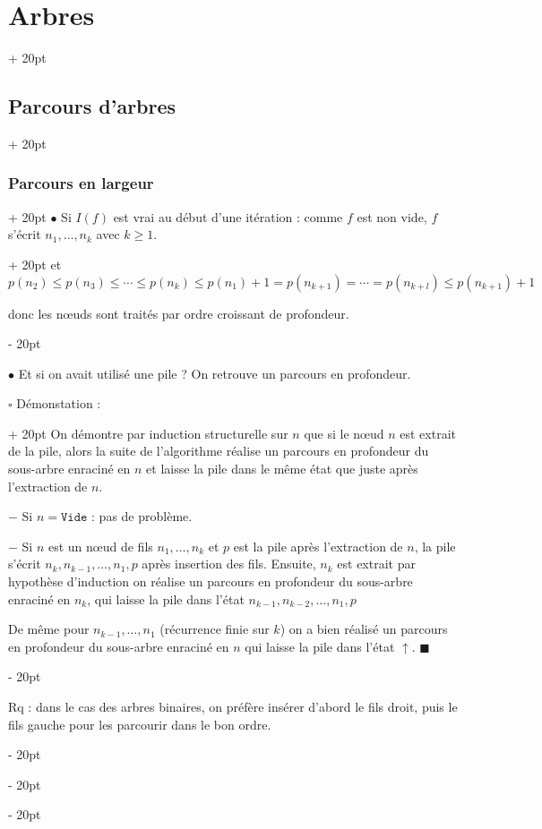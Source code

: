 \documentclass[a4paper, 12pt, twoside]{article}
\renewcommand{\le}{\leqslant}
\renewcommand{\ge}{\geqslant}
\newcommand{\ind}[1][20pt]{\advance\leftskip + #1}
\newcommand{\deind}[1][20pt]{\advance\leftskip - #1}
\newenvironment{indt}[2][20pt]{#2 \par \ind[#1]}{\par \deind} %
\begin{document}
\begin{indt}{\section{Arbres}}
\begin{indt}{\subsection{Parcours d'arbres}}
\begin{indt}{\subsubsection{Parcours en largeur}}
\begin{indt}{$\bullet$ Si $I(f)$ est vrai au début d'une itération : comme $f$ est non vide, $f$ s'écrit $n_1, \ldots, n_k$ avec $k \ge 1$.}
                    et $p(n_2) \le p(n_3) \le \cdots \le p(n_k) \le p(n_1) + 1 = p(n_{k + 1}) = \cdots = p(n_{k + l}) \le p(n_{k + 1}) + 1$
                    
                    donc les n\oe uds sont traités par ordre croissant de profondeur.
                \end{indt}
                
                \vspace{12pt}
                
                $\bullet$ Et si on avait utilisé une pile ?
                On retrouve un parcours en profondeur.
                
                \vspace{12pt}
                
                \begin{indt}{$\square$ Démonstation :}
                    On démontre par induction structurelle sur $n$ que si le n\oe ud $n$ est extrait de la pile, alors la suite de l'algorithme réalise un parcours en profondeur du sous-arbre enraciné en $n$ et laisse la pile dans le même état que juste après l'extraction de $n$.
                    
                    \vspace{6pt}
                    
                    $-$ Si $n = \mathtt{Vide}$ : pas de problème.
                    
                    $-$ Si $n$ est un n\oe ud de fils $n_1, \ldots, n_k$ et $p$ est la pile après l'extraction de $n$, la pile s'écrit $n_k, n_{k - 1}, \ldots, n_1, p$ après insertion des fils.
                    Ensuite, $n_k$ est extrait par hypothèse d'induction on réalise un parcours en profondeur du sous-arbre enraciné en $n_k$, qui laisse la pile dans l'état $n_{k - 1}, n_{k - 2}, \ldots, n_1, p$
                    
                    De même pour $n_{k - 1}, \ldots, n_1$ (récurrence finie sur $k$) on a bien réalisé un parcours en profondeur du sous-arbre enraciné en $n$ qui laisse la pile dans l'état $\uparrow$. $\blacksquare$
                \end{indt}
                
                \vspace{12pt}
                
                Rq : dans le cas des arbres binaires, on préfère insérer d'abord le fils droit, puis le fils gauche pour les parcourir dans le bon ordre.
                

\end{indt}
\end{indt}
\end{indt}
\end{document}
